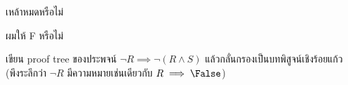 \begin{example}
\begin{exercise}
  เหล้าหมดหรือไม่
\end{exercise}
\begin{exercise}
  ผมให้ F หรือไม่
\end{exercise}
\iffalse
นอกจากนี้ เรายังสรุปได้ด้วยว่า $\neg Q$ เป็นจริง กล่าวคือ เหล้าไม่หมด

อย่างไรก็ดี หากจะพยายามสรุปว่าผมให้ F หรือไม่ (กล่าวคือ ว่า $S$ เป็นจริงหรือเท็จ) ข้อมูลที่เกี่ยวข้องที่เราทราบคือ $\neg(R\wedge S)$ เป็นจริง กล่าวคือ $\neg R\vee\neg S$ เป็นจริง แต่เนื่องจากเราทราบด้วยว่า $\neg R$ เป็นจริง ไม่ว่า $S$ จะเป็นจริงหรือเท็จก็ไม่ส่งผลต่อค่าความจริงของ $\neg R\vee\neg S$ \enskip ดังนั้น จึงไม่สามารถสรุปได้แน่ชัดว่าผมจะให้ F หรือไม่
\fi
\end{example}

\begin{exercise}
  เขียน proof tree ของประพจน์ $\neg R \implies \neg(R\wedge S)$ แล้วกลั่นกรองเป็นบทพิสูจน์เชิงร้อยแก้ว (พึงระลึกว่า $\neg R$ มีความหมายเช่นเดียวกับ $R\implies\False$)
\end{exercise}
